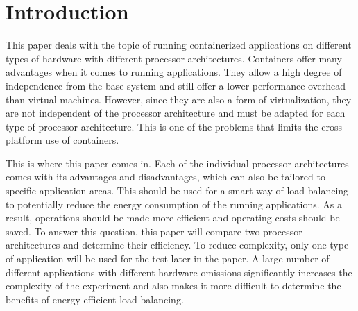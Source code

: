 \section{Introduction}
This paper deals with the topic of running containerized applications on different types of hardware with different processor architectures.
Containers offer many advantages when it comes to running applications. They allow a high degree of independence from the base system and still offer a lower performance overhead than virtual machines. However, since they are also a form of virtualization, they are not independent of the processor architecture and must be adapted for each type of processor architecture. This is one of the problems that limits the cross-platform use of containers.

This is where this paper comes in. Each of the individual processor architectures comes with its advantages and disadvantages, which can also be tailored to specific application areas. This should be used for a smart way of load balancing to potentially reduce the energy consumption of the running applications. As a result, operations should be made more efficient and operating costs should be saved.
To answer this question, this paper will compare two processor architectures and determine their efficiency. To reduce complexity, only one type of application will be used for the test later in the paper. A large number of different applications with different hardware omissions significantly increases the complexity of the experiment and also makes it more difficult to determine the benefits of energy-efficient load balancing.


